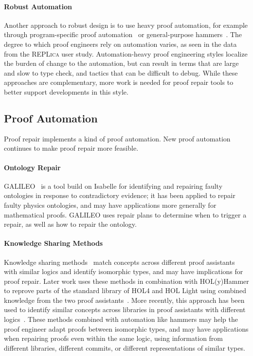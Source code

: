 \paragraph{Robust Automation}
Another approach to robust design is to use heavy proof automation, for example through
program-specific proof automation~\cite{chlipala:cpdt}
or general-purpose hammers~\cite{Blanchette2016b, Blanchette2013, Kaliszyk2014, Czajka2018}.
The degree to which proof engineers rely on automation varies, as seen in the data from the \textsc{REPLica} user study.
Automation-heavy proof engineering styles localize the burden of change to the automation,
but can result in terms that are large and slow to type check,
and tactics that can be difficult to debug.
While these approaches are complementary, more work is needed for proof repair tools to better support 
developments in this style.

\subsection{Proof Automation}
\label{sec:automation}

Proof repair implements a kind of proof automation.
New proof automation continues to make proof repair more feasible.

\paragraph{Ontology Repair}
GALILEO~\cite{chan2011galileo} is a tool build on Isabelle for identifying and repairing faulty ontologies in response to contradictory
evidence; it has been applied to repair faulty physics ontologies, and may have applications more generally for mathematical proofs.
GALILEO uses repair plans to determine when to trigger a repair, as well as how to repair the ontology.

\paragraph{Knowledge Sharing Methods}
Knowledge sharing methods~\cite{gauthier2014} match concepts across
different proof assistants with similar logics and identify isomorphic types,
and may have implications for proof repair.
Later work uses these methods in combination with HOL(y)Hammer to
reprove parts of the standard library of HOL4 and HOL Light using combined knowledge 
from the two proof assistants~\cite{Gauthier2015}. 
More recently, this approach has been used to identify similar concepts
across libraries in proof assistants with different logics~\cite{gauthier2017}.
These methods combined with automation like hammers may help the proof engineer 
adapt proofs between isomorphic types, and may have applications
when repairing proofs even within the same logic, using information from different 
libraries, different commits, or different representations of similar types.

